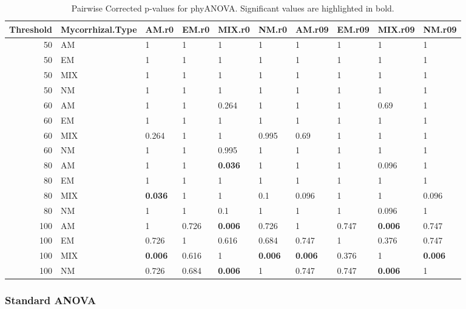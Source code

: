 \documentclass[]{article}
\begin{document}
\begin{table}[H]

\caption{\label{tab:unnamed-chunk-31}Pairwise Corrected p-values for phyANOVA. Significant values are highlighted in bold.}
\centering
\begin{tabular}{r|l|l|l|l|l|l|l|l|l}
\hline
Threshold & Mycorrhizal.Type & AM.r0 & EM.r0 & MIX.r0 & NM.r0 & AM.r09 & EM.r09 & MIX.r09 & NM.r09\\
\hline
50 & AM & 1 & 1 & 1 & 1 & 1 & 1 & 1 & 1\\
\hline
50 & EM & 1 & 1 & 1 & 1 & 1 & 1 & 1 & 1\\
\hline
50 & MIX & 1 & 1 & 1 & 1 & 1 & 1 & 1 & 1\\
\hline
50 & NM & 1 & 1 & 1 & 1 & 1 & 1 & 1 & 1\\
\hline
60 & AM & 1 & 1 & 0.264 & 1 & 1 & 1 & 0.69 & 1\\
\hline
60 & EM & 1 & 1 & 1 & 1 & 1 & 1 & 1 & 1\\
\hline
60 & MIX & 0.264 & 1 & 1 & 0.995 & 0.69 & 1 & 1 & 1\\
\hline
60 & NM & 1 & 1 & 0.995 & 1 & 1 & 1 & 1 & 1\\
\hline
80 & AM & 1 & 1 & \textbf{0.036} & 1 & 1 & 1 & 0.096 & 1\\
\hline
80 & EM & 1 & 1 & 1 & 1 & 1 & 1 & 1 & 1\\
\hline
80 & MIX & \textbf{0.036} & 1 & 1 & 0.1 & 0.096 & 1 & 1 & 0.096\\
\hline
80 & NM & 1 & 1 & 0.1 & 1 & 1 & 1 & 0.096 & 1\\
\hline
100 & AM & 1 & 0.726 & \textbf{0.006} & 0.726 & 1 & 0.747 & \textbf{0.006} & 0.747\\
\hline
100 & EM & 0.726 & 1 & 0.616 & 0.684 & 0.747 & 1 & 0.376 & 0.747\\
\hline
100 & MIX & \textbf{0.006} & 0.616 & 1 & \textbf{0.006} & \textbf{0.006} & 0.376 & 1 & \textbf{0.006}\\
\hline
100 & NM & 0.726 & 0.684 & \textbf{0.006} & 1 & 0.747 & 0.747 & \textbf{0.006} & 1\\
\hline
\end{tabular}
\end{table}

\hypertarget{standard-anova-5}{%
\subsubsection{Standard ANOVA}\label{standard-anova-5}}
\end{document}

